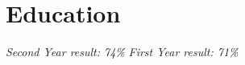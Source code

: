 \documentclass{cvclass}
\begin{document}
\titlespacing*{\subsection}{0pt}{\baselineskip}{1pt}
\address{113D, Pembroke Road, Bristol, BS8 3EU}
\address{Email: sollyvarcoe@gmail.com, Mobile: 07908911995}
\address{Github: www.github.com/sollyvarcoe}
\section{Education}
\newline
\indent\indent\textit{Second Year result: 74\%}\newline
\indent\indent\textit{\space\space First Year result: 71\%}
\end{document}
